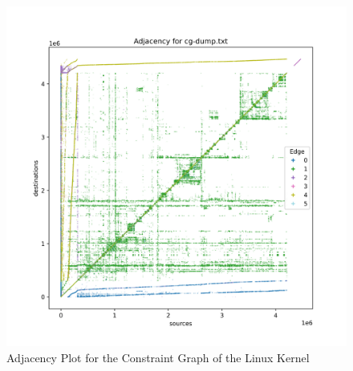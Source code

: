 \begin{figure}
    \centering
    \includegraphics[width=1.\textwidth]{img/linux-consg-min.png}
    \caption{Adjacency Plot for the Constraint Graph of the Linux Kernel}
    \label{fig:linux-consg}
\end{figure}



